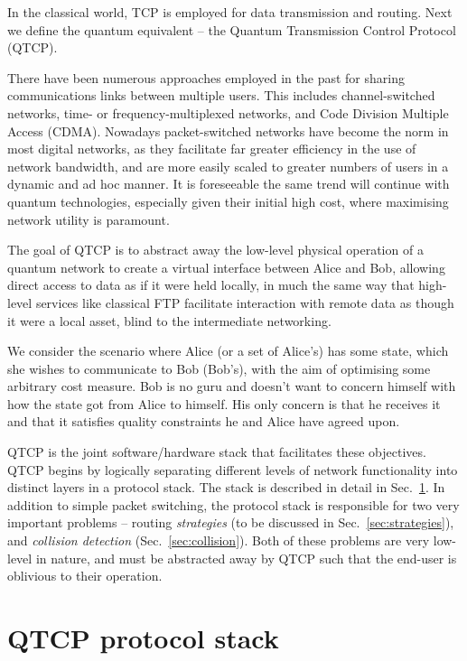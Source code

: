 \documentclass[aps,rmp,twocolumn,amsmath,amssymb,nofootinbib,superscriptaddress]{revtex4}
\begin{document}
In the classical world, TCP is employed for data transmission and routing. Next we define the quantum equivalent -- the Quantum Transmission Control Protocol (QTCP).

There have been numerous approaches employed in the past for sharing communications links between multiple users. This includes channel-switched networks, time- or frequency-multiplexed networks, and Code Division Multiple Access (CDMA). Nowadays packet-switched networks have become the norm in most digital networks, as they facilitate far greater efficiency in the use of network bandwidth, and are more easily scaled to greater numbers of users in a dynamic and ad hoc manner. It is foreseeable the same trend will continue with quantum technologies, especially given their initial high cost, where maximising network utility is paramount.

The goal of QTCP is to abstract away the low-level physical operation of a quantum network to create a virtual interface between Alice and Bob, allowing direct access to data as if it were held locally, in much the same way that high-level services like classical FTP facilitate interaction with remote data as though it were a local asset, blind to the intermediate networking.

We consider the scenario where Alice (or a set of Alice's) has some state, which she wishes to communicate to Bob (Bob's), with the aim of optimising some arbitrary cost measure. Bob is no guru and doesn't want to concern himself with how the state got from Alice to himself. His only concern is that he receives it and that it satisfies quality constraints he and Alice have agreed upon.

QTCP is the joint software/hardware stack that facilitates these objectives. QTCP begins by logically separating different levels of network functionality into distinct layers in a protocol stack. The stack is described in detail in Sec.~\ref{sec:prot_stack}. In addition to simple packet switching, the protocol stack is responsible for two very important problems -- routing \emph{strategies} (to be discussed in Sec.~\ref{sec:strategies}), and \emph{collision detection} (Sec.~\ref{sec:collision}). Both of these problems are very low-level in nature, and must be abstracted away by QTCP such that the end-user is oblivious to their operation.

%
%

\section{QTCP protocol stack} \label{sec:prot_stack}
\end{document}
